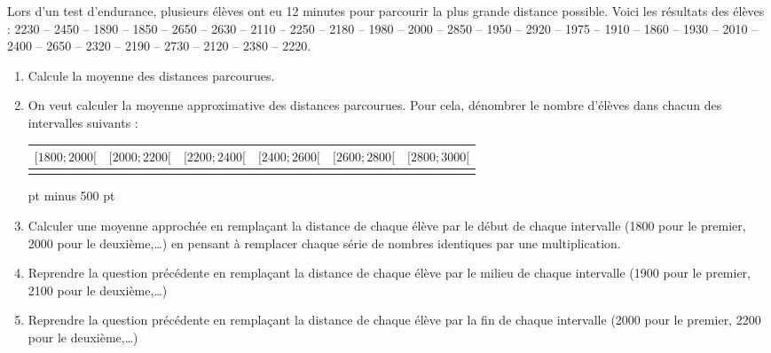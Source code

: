 
Lors d'un test d'endurance, plusieurs élèves ont eu 12 minutes pour
parcourir la plus grande distance possible. Voici les résultats des
élèves :
2230 -- 2450 -- 1890 -- 1850 -- 2650 -- 2630 -- 2110 -- 2250 -- 2180 --
1980 -- 2000 -- 2850 -- 1950 -- 2920 -- 1975 -- 1910 -- 1860 -- 1930 --
2010 -- 2400 -- 2650 -- 2320 -- 2190 -- 2730 -- 2120 -- 2380 -- 2220.

\begin{enumerate}
\item
Calcule la moyenne des distances parcourues.

\item
On veut calculer la moyenne approximative des distances parcourues.
Pour cela, dénombrer le nombre d'élèves dans chacun des intervalles
suivants :\\
\begin{tabular}{|*{6}{c|}}
\hline
$[1800 ; 2000 [$ & $[2000 ; 2200 [$ &
$[2200 ; 2400 [$ & $[2400 ; 2600 [$ &
$[2600 ; 2800 [$ & $[2800 ; 3000 [$ \\
\hline
&&
 &&& \\
\hline
\end{tabular} pt minus 500 pt\strut
\item
Calculer une moyenne approchée en remplaçant la distance de chaque élève
	par le début de chaque intervalle (1800 pour le premier, 2000 pour
	le deuxième,\dots) en pensant à remplacer chaque série de nombres
	identiques par une multiplication.
	
\item Reprendre la question précédente en 
	remplaçant la distance de chaque élève
	par le milieu de chaque intervalle (1900 pour le premier, 2100 pour
	le deuxième,\dots)
	
\item Reprendre la question précédente en 
	remplaçant la distance de chaque élève
	par la fin de chaque intervalle (2000 pour le premier, 2200 pour
	le deuxième,\dots)
	
\end{enumerate}